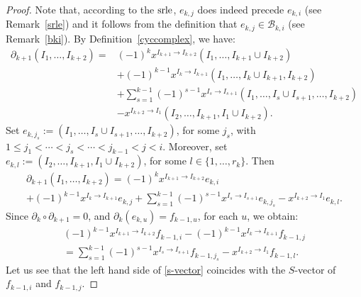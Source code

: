 \documentclass[ALCO]{cedram}
\newcommand{\mcb}{\mbox{$\mathcal{B}$}}
\newcommand{\dif}{\mbox{$\partial$}}
\newcommand{\srle}{\mbox{${\rm srle}$}}
\begin{document}
\begin{proof}
Note that, according to the $\srle$, $e_{k,j}$ does indeed precede
$e_{k,i}$ (see Remark~\ref{srle}) and it follows from the definition
that $e_{k,j}\in\mcb_{k,i}$ (see Remark~\ref{bki}). By
Definition~\ref{cyccomplex}, we have:
\begin{align*}
\dif_{k+1}(I_1,\ldots,I_{k+2})=& (-1)^{k}x^{I_{k+1}\to
    I_{k+2}}(I_1,\ldots ,I_{k+1}\cup I_{k+2})\\
&+ (-1)^{k-1}x^{I_{k}\to I_{k+1}}(I_1,\ldots ,I_{k}\cup
  I_{k+1},I_{k+2})\\
&+\sum_{s=1}^{k-1}(-1)^{s-1}x^{I_s\to
    I_{s+1}}(I_1,\ldots ,I_s\cup I_{s+1},\ldots
  ,I_{k+2})\\
&-x^{I_{k+2}\to I_1}(I_2,\ldots,I_{k+1},I_1\cup I_{k+2}).
\end{align*}
Set $e_{k,j_s}:=(I_1,\ldots ,I_s\cup I_{s+1},\ldots ,I_{k+2})$, for
some $j_s$, with $1\leq j_1<\cdots< j_s<\cdots<j_{k-1}<j<i$.
Moreover, set $e_{k,l}:=(I_2,\ldots,I_{k+1},I_1\cup I_{k+2})$, for
some $l\in \{1,\ldots ,r_{k}\}$. Then
\begin{multline}\label{difbasisele}
 \dif_{k+1}(I_1,\ldots,I_{k+2})= (-1)^{k}x^{I_{k+1}\to
  I_{k+2}}e_{k,i}\\ 
+(-1)^{k-1}x^{I_{k}\to   I_{k+1}}e_{k,j}+ \sum_{s=1}^{k-1}(-1)^{s-1}x^{I_s\to
  I_{s+1}}e_{k,j_s}-x^{I_{k+2}\to I_1}e_{k,l}.
\end{multline}
Since $\dif_{k}\circ\dif_{k+1}=0$, and $\dif_{k}(e_{k,u})=f_{k-1,u}$,
for each $u$, we obtain:
\begin{multline}\label{s-vector}
 (-1)^{k-1}x^{I_{k+1}\to I_{k+2}}f_{k-1,i}-(-1)^{k-1}x^{I_{k}\to
    I_{k+1}}f_{k-1,j}\\
= \sum_{s=1}^{k-1}(-1)^{s-1}x^{I_s\to
    I_{s+1}}f_{k-1,j_s}-x^{I_{k+2}\to I_1}f_{k-1,l}.
\end{multline}
Let us see that the left hand side of \eqref{s-vector} coincides
with the $S$-vector of $f_{k-1,i}$ and $f_{k-1,j}$. 


\end{proof}
\end{document}
